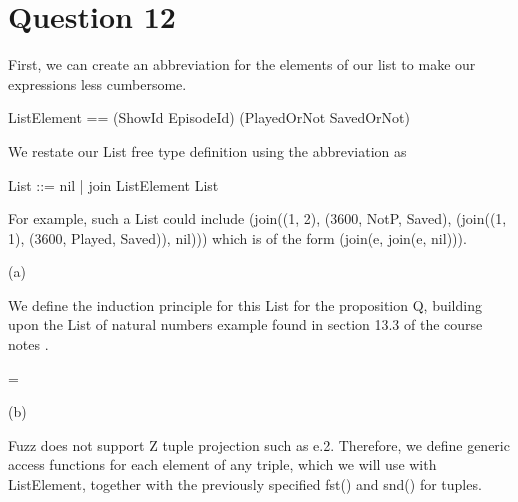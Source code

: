 \documentclass[a4paper,10pt,fleqn]{article}
\begin{document}
\section*{Question 12}

\noindent First, we can create an abbreviation for the elements of our list to make our expressions less cumbersome.

\bigskip

\begin{zed}
ListElement == (ShowId \cross EpisodeId) \cross (\nat \cross PlayedOrNot \cross SavedOrNot)
\end{zed}

\noindent We restate our List free type definition using the abbreviation as

\bigskip

\begin{zed}List ::= nil | join \ldata ListElement \cross List \rdata\end{zed}

\noindent For example, such a List could include (join((1, 2), (3600, NotP, Saved), (join((1, 1), (3600, Played, Saved)), nil))) which is of the form (join(e, join(e, nil))).

\bigskip

\noindent\hspace*{\parindent}(a)

\setlength{\leftskip}{\dimexpr\parindent+2em\relax}
\noindent We define the induction principle for this List for the proposition Q, building upon the List of natural numbers example found in section 13.3 of the course notes \citep[page 162]{simpson-notes}.

\bigskip


\bigskip

\setlength{\leftskip}{\dimexpr\parindent+2em\relax}
\savedleftskip=\leftskip
\noindent
{}
\bigskip

\setlength{\leftskip}{0pt}
\medskip

\noindent\hspace*{\parindent}(b)

\setlength{\leftskip}{\dimexpr\parindent+2em\relax}
\noindent Fuzz does not support Z tuple projection such as e.2. Therefore, we define generic access functions for each element of any triple, which we will use with ListElement, together with the previously specified fst() and snd() for tuples.
\end{document}
